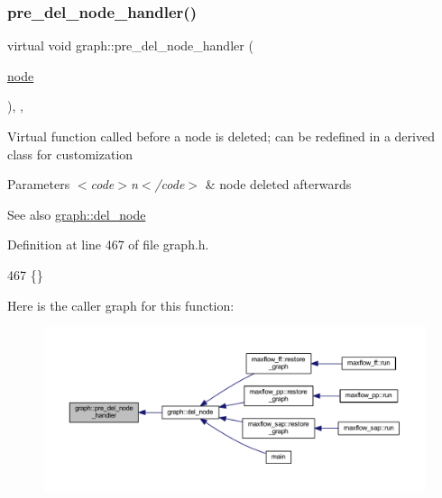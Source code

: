 \subsubsection{\texorpdfstring{pre\+\_\+del\+\_\+node\+\_\+handler()}{pre\_del\_node\_handler()}}
{\footnotesize\ttfamily virtual void graph\+::pre\+\_\+del\+\_\+node\+\_\+handler (\begin{DoxyParamCaption}\item[{\mbox{\hyperlink{classnode}{node}}}]{ }\end{DoxyParamCaption})\hspace{0.3cm}{\ttfamily [inline]}, {\ttfamily [virtual]}, {\ttfamily [inherited]}}

Virtual function called before a node is deleted; can be redefined in a derived class for customization


\begin{DoxyParams}{Parameters}
{\em $<$code$>$n$<$/code$>$} & node deleted afterwards \\
\hline
\end{DoxyParams}
\begin{DoxySeeAlso}{See also}
\mbox{\hyperlink{classgraph_a8bdc09d5b9ac4bd26586b054d8fcbe91}{graph\+::del\+\_\+node}} 
\end{DoxySeeAlso}


Definition at line 467 of file graph.\+h.


\begin{DoxyCode}
467 \{\}      
\end{DoxyCode}
Here is the caller graph for this function\+:
\nopagebreak
\begin{figure}[H]
\begin{center}
\leavevmode
\includegraphics[width=350pt]{classgraph_a64699c6cb14cdedab5e13232a8f3e754_icgraph}
\end{center}
\end{figure}
\mbox{\label{classgraph_ab257e02f6fd04fef244032a3a15bec9f}} 
